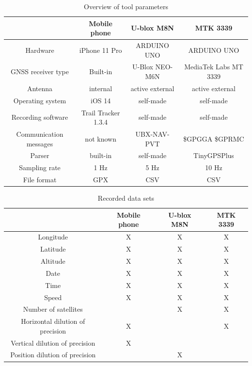 \documentclass{article}
\begin{document}
			\begin{table}[h]
				\centering
				\begin{tabular}{|c|c|c|c|}
					\hline 
					& Mobile phone & U-blox M8N & MTK 3339 \\ 
					\hline 
					Hardware & iPhone 11 Pro & ARDUINO UNO & ARDUINO UNO \\ 
					\hline 
					GNSS receiver type & Built-in & U-Blox NEO-M6N & MediaTek Labs MT 3339 \\ 
					\hline 
					Antenna & internal & active external & active external \\ 
					\hline 
					Operating system & iOS 14 & self-made & self-made \\ 
					\hline 
					Recording software & Trail Tracker 1.3.4 & self-made & self-made \\ 
					\hline 
					Communication messages & not known & UBX-NAV-PVT & \$GPGGA \$GPRMC \\ 
					\hline 
					Parser & built-in & self-made & TinyGPSPlus \\
					\hline 
					Sampling rate & 1 Hz & 5 Hz & 10 Hz \\ 
					\hline 
					File format & GPX & CSV & CSV \\ 
					\hline 
				\end{tabular} 
				\caption{Overview of tool parameters}
				\label{table:toolparams}
			\end{table}
			\begin{table}[h]
				\centering
				\begin{tabular}{|c|c|c|c|}
					\hline 
					& Mobile phone & U-blox M8N & MTK 3339 \\ 
					\hline 
					Longitude & X & X & X \\ 
					\hline 
					Latitude & X & X & X \\ 
					\hline 
					Altitude & X & X & X \\ 
					\hline 
					Date & X & X & X \\ 
					\hline 
					Time & X & X & X \\ 
					\hline 
					Speed & X & X & X \\ 
					\hline 
					Number of satellites & & X & X \\ 
					\hline 
					Horizontal dilution of precision & X & & X \\ 
					\hline 
					Vertical dilution of precision & X & & \\
					\hline 
					Position dilution of precision & & X &  \\ 
					\hline 
				\end{tabular} 
				\caption{Recorded data sets}
				\label{table:datasets}
			\end{table}
\end{document}
